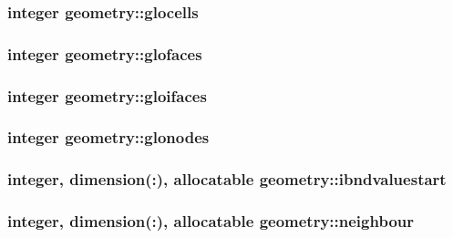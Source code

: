 \hypertarget{classgeometry_a0512cb49b2ee4ae8aa67fe7b3e9cfa25}{
\subsubsection[{glocells}]{\setlength{\rightskip}{0pt plus 5cm}integer geometry\-::glocells}}\label{classgeometry_a0512cb49b2ee4ae8aa67fe7b3e9cfa25}
\hypertarget{classgeometry_a11e0bee8bca796dfc9673a1652675d95}{
\subsubsection[{glofaces}]{\setlength{\rightskip}{0pt plus 5cm}integer geometry\-::glofaces}}\label{classgeometry_a11e0bee8bca796dfc9673a1652675d95}
\hypertarget{classgeometry_aa0b3019664f1e20f95c082706fbf4bf6}{
\subsubsection[{gloifaces}]{\setlength{\rightskip}{0pt plus 5cm}integer geometry\-::gloifaces}}\label{classgeometry_aa0b3019664f1e20f95c082706fbf4bf6}
\hypertarget{classgeometry_aa32cd7bcc888322cd384ba928fbe0fd8}{
\subsubsection[{glonodes}]{\setlength{\rightskip}{0pt plus 5cm}integer geometry\-::glonodes}}\label{classgeometry_aa32cd7bcc888322cd384ba928fbe0fd8}
\hypertarget{classgeometry_ac725fa5c48485899cdc2607d4c0e3278}{
\subsubsection[{ibndvaluestart}]{\setlength{\rightskip}{0pt plus 5cm}integer, dimension(\-:), allocatable geometry\-::ibndvaluestart}}\label{classgeometry_ac725fa5c48485899cdc2607d4c0e3278}
\hypertarget{classgeometry_afc765695937174a634f048738ae0dc8e}{
\subsubsection[{neighbour}]{\setlength{\rightskip}{0pt plus 5cm}integer, dimension(\-:), allocatable geometry\-::neighbour}}\label{classgeometry_afc765695937174a634f048738ae0dc8e}
